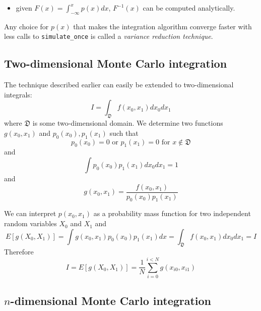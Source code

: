\documentclass[justified, sixbynine]{tufte-book}
\def\ft{\small\tt}
\theoremstyle{plain}%
\newtheorem * {corollary}{Corollary}
\theoremstyle{definition}
\theoremstyle{remark}
\newtheorem * {remark}{Remark}
\newtheorem * {note}{Note}
\begin{document}
\begin{fullwidth}
\begin{itemize}
\item  given $F(x)=\int_{-\infty }^xp(x)dx$, $F^{-1}(x)$ can be computed
analytically.
\end{itemize}

Any choice for $p(x)$ that makes the integration algorithm converge faster with less calls to {\ft simulate\_once} is called a {\it variance reduction technique}.

\goodbreak\subsection{Two-dimensional Monte Carlo integration}

The technique described earlier can easily be extended to two-dimensional integrals:
\begin{equation}
I=\int_{{\mathfrak D}}f(x_0, x_1)dx_0dx_1
\end{equation}
where ${\mathfrak D}$ is some two-dimensional domain. We determine two functions
$g(x_0, x_1)$ and $p_0(x_0), p_1(x_1)$ such that
\begin{equation}
p_0(x_0)=0\text{ or }p_1(x_1)=0\text{ for }x\notin {\mathfrak D}
\end{equation}
and
\begin{equation}
\int p_0(x_0)p_1(x_1)dx_0dx_1=1
\end{equation}
and
\begin{equation}
g(x_0, x_1)=\frac{f(x_0, x_1)}{p_0(x_0)p_1(x_1)}
\end{equation}

We can interpret $p(x_0, x_1)$ as a probability mass function for two
independent random variables $X_0$ and $X_1$ and
\begin{equation}
E[g(X_0, X_1)]=\int g(x_0, x_1)p_0(x_0)p_1(x_1)dx=\int_{{\mathfrak D}%
}f(x_0, x_1)dx_0dx_1=I
\end{equation}
Therefore
\begin{equation}
I = E[g(X_0, X_1)] = \frac 1N\sum_{i=0}^{i<N}g(x_{i0}, x_{i1})
\end{equation}

\goodbreak\subsection{$n$-dimensional Monte Carlo integration}


\end{fullwidth}
\end{document}
